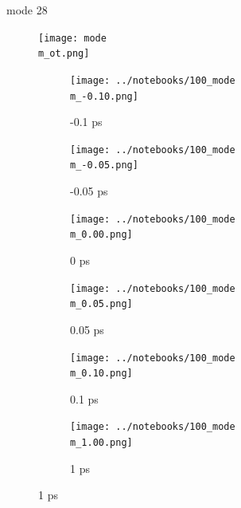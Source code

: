 \documentclass{beamer}
\begin{document}
\renewcommand\m{28}
\begin{frame}{mode \m}
					\vspace{\vh mm}
	\begin{figure}
		\centering
		\texttt{[image: mode\\m\_ot.png]}
	\end{figure}
	\begin{figure}
		\centering
		\begin{subfigure}[b]{\w\textwidth}
			\centering
			\texttt{[image: ../notebooks/100\_mode\\m\_-0.10.png]}
			\caption{-0.1 ps}
		\end{subfigure}
		\begin{subfigure}[b]{\w\textwidth}
			\centering
			\texttt{[image: ../notebooks/100\_mode\\m\_-0.05.png]}
			\caption{-0.05 ps}
		\end{subfigure}
		\begin{subfigure}[b]{\w\textwidth}
			\centering
			\texttt{[image: ../notebooks/100\_mode\\m\_0.00.png]}
			\caption{0 ps}
		\end{subfigure}
		\begin{subfigure}[b]{\w\textwidth}
			\centering
			\texttt{[image: ../notebooks/100\_mode\\m\_0.05.png]}
			\caption{0.05 ps}
		\end{subfigure}
		\begin{subfigure}[b]{\w\textwidth}
			\centering
			\texttt{[image: ../notebooks/100\_mode\\m\_0.10.png]}
			\caption{0.1 ps}
		\end{subfigure}
		\begin{subfigure}[b]{\w\textwidth}
			\centering
			\texttt{[image: ../notebooks/100\_mode\\m\_1.00.png]}
			\caption{1 ps}
		\end{subfigure}
	\end{figure}
\end{frame}
\end{document}
